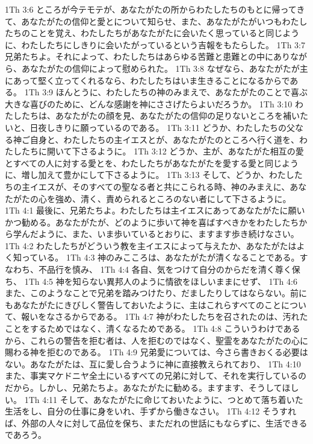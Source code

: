 1Th 3:6  ところが今テモテが、あなたがたの所からわたしたちのもとに帰ってきて、あなたがたの信仰と愛とについて知らせ、また、あなたがたがいつもわたしたちのことを覚え、わたしたちがあなたがたに会いたく思っていると同じように、わたしたちにしきりに会いたがっているという吉報をもたらした。
1Th 3:7  兄弟たちよ。それによって、わたしたちはあらゆる苦難と患難との中にありながら、あなたがたの信仰によって慰められた。
1Th 3:8  なぜなら、あなたがたが主にあって堅く立ってくれるなら、わたしたちはいま生きることになるからである。
1Th 3:9  ほんとうに、わたしたちの神のみまえで、あなたがたのことで喜ぶ大きな喜びのために、どんな感謝を神にささげたらよいだろうか。
1Th 3:10  わたしたちは、あなたがたの顔を見、あなたがたの信仰の足りないところを補いたいと、日夜しきりに願っているのである。
1Th 3:11  どうか、わたしたちの父なる神ご自身と、わたしたちの主イエスとが、あなたがたのところへ行く道を、わたしたちに開いて下さるように。
1Th 3:12  どうか、主が、あなたがた相互の愛とすべての人に対する愛とを、わたしたちがあなたがたを愛する愛と同じように、増し加えて豊かにして下さるように。
1Th 3:13  そして、どうか、わたしたちの主イエスが、そのすべての聖なる者と共にこられる時、神のみまえに、あなたがたの心を強め、清く、責められるところのない者にして下さるように。
1Th 4:1  最後に、兄弟たちよ。わたしたちは主イエスにあってあなたがたに願いかつ勧める。あなたがたが、どのように歩いて神を喜ばすべきかをわたしたちから学んだように、また、いま歩いているとおりに、ますます歩き続けなさい。
1Th 4:2  わたしたちがどういう教を主イエスによって与えたか、あなたがたはよく知っている。
1Th 4:3  神のみこころは、あなたがたが清くなることである。すなわち、不品行を慎み、
1Th 4:4  各自、気をつけて自分のからだを清く尊く保ち、
1Th 4:5  神を知らない異邦人のように情欲をほしいままにせず、
1Th 4:6  また、このようなことで兄弟を踏みつけたり、だましたりしてはならない。前にもあなたがたにきびしく警告しておいたように、主はこれらすべてのことについて、報いをなさるからである。
1Th 4:7  神がわたしたちを召されたのは、汚れたことをするためではなく、清くなるためである。
1Th 4:8  こういうわけであるから、これらの警告を拒む者は、人を拒むのではなく、聖霊をあなたがたの心に賜わる神を拒むのである。
1Th 4:9  兄弟愛については、今さら書きおくる必要はない。あなたがたは、互に愛し合うように神に直接教えられており、
1Th 4:10  また、事実マケドニヤ全土にいるすべての兄弟に対して、それを実行しているのだから。しかし、兄弟たちよ。あなたがたに勧める。ますます、そうしてほしい。
1Th 4:11  そして、あなたがたに命じておいたように、つとめて落ち着いた生活をし、自分の仕事に身をいれ、手ずから働きなさい。
1Th 4:12  そうすれば、外部の人々に対して品位を保ち、まただれの世話にもならずに、生活できるであろう。
